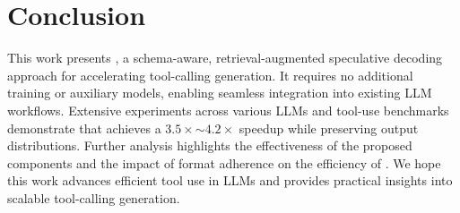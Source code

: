\section{Conclusion}
\label{sec:conclusion}
This work presents \method, a schema-aware, retrieval-augmented speculative decoding approach for accelerating tool-calling generation. It requires no additional training or auxiliary models, enabling seamless integration into existing LLM workflows. Extensive experiments across various LLMs and tool-use benchmarks demonstrate that \method achieves a $3.5\times$$\sim$$4.2\times$ speedup while preserving output distributions. Further analysis highlights the effectiveness of the proposed components and the impact of format adherence on the efficiency of \method. We hope this work advances efficient tool use in LLMs and provides practical insights into scalable tool-calling generation.